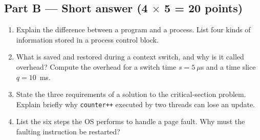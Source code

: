 \documentclass[11pt,a4paper]{article}
\begin{document}
\subsection*{Part B --- Short answer \hfill (4 $\times$ 5 = 20 points)}
\begin{enumerate}[leftmargin=2.0em,label=B\arabic*.,itemsep=0.4em]
  \item Explain the difference between a program and a process. List four kinds of information stored in a process control block.
  \item What is saved and restored during a context switch, and why is it called overhead? Compute the overhead for a switch time $s = 5\ \mu$s and a time slice $q = 10$~ms.
  \item State the three requirements of a solution to the critical-section problem. Explain briefly why \texttt{counter++} executed by two threads can lose an update.
  \item List the six steps the OS performs to handle a page fault. Why must the faulting instruction be restarted?
\end{enumerate}
\end{document}
